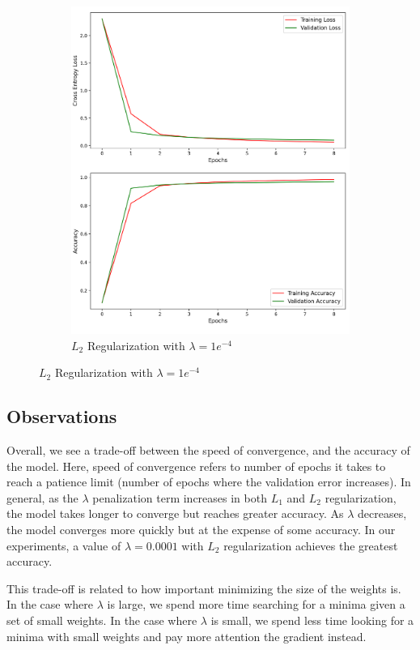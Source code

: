 \begin{figure}[H]
\begin{subfigure}{0.5\textwidth}
		\includegraphics[width=1.0\textwidth]{./images/l2_e4.png}
		\caption{$L_2$ Regularization with $\lambda = 1e^{-4}$}
		\label{fig:l2_1e4}
	\end{subfigure}
\end{figure}

\subsection{Observations}
Overall, we see a trade-off between the speed of convergence, and the accuracy of the model. Here, speed of convergence refers to number of epochs it takes to reach a patience limit (number of epochs where the validation error increases). In general, as the $\lambda$ penalization term increases in both $L_1$ and $L_2$ regularization, the model takes longer to converge but reaches greater accuracy. As $\lambda$ decreases, the model converges more quickly but at the expense of some accuracy. In our experiments, a value of $\lambda = 0.0001$ with $L_2$ regularization achieves the greatest accuracy.

This trade-off is related to how important minimizing the size of the weights is. In the case where $\lambda$ is large, we spend more time searching for a minima given a set of small weights. In the case where $\lambda$ is small, we spend less time looking for a minima with small weights and pay more attention the gradient instead.

